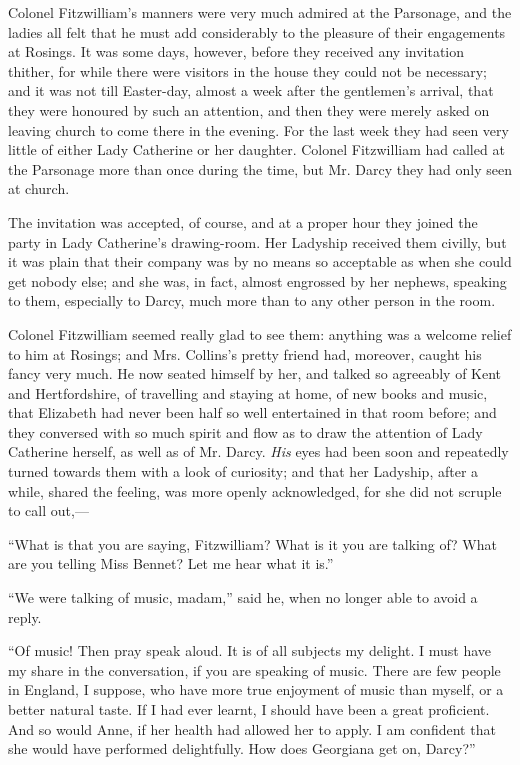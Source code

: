 Colonel Fitzwilliam's manners were very much admired at the Parsonage, and the ladies all felt that he must add considerably to the pleasure of their engagements at Rosings. It was some days, however, before they received any invitation thither, for while there were visitors in the house they could not be necessary; and it was not till Easter-day, almost a week after the gentlemen's arrival, that they were honoured by such an attention, and then they were merely asked on leaving church to come there in the evening. For the last week they had seen very little of either Lady Catherine or her daughter. Colonel Fitzwilliam had called at the Parsonage more than once during the time, but Mr. Darcy they had only seen at church.

The invitation was accepted, of course, and at a proper hour they joined the party in Lady Catherine's drawing-room. Her Ladyship received them civilly, but it was plain that their company was by no means so acceptable as when she could get nobody else; and she was, in fact, almost engrossed by her nephews, speaking to them, especially to Darcy, much more than to any other person in the room.

Colonel Fitzwilliam seemed really glad to see them: anything was a welcome relief to him at Rosings; and Mrs. Collins's pretty friend had, moreover, caught his fancy very much. He now seated himself by her, and talked so agreeably of Kent and Hertfordshire, of travelling and staying at home, of new books and music, that Elizabeth had never been half so well entertained in that room before; and they conversed with so much spirit and flow as to draw the attention of Lady Catherine herself, as well as of Mr. Darcy. \textit{His} eyes had been soon and repeatedly turned towards them with a look of curiosity; and that her Ladyship, after a while, shared the feeling, was more openly acknowledged, for she did not scruple to call out,---

``What is that you are saying, Fitzwilliam? What is it you are talking of? What are you telling Miss Bennet? Let me hear what it is.''

``We were talking of music, madam,'' said he, when no longer able to avoid a reply.

``Of music! Then pray speak aloud. It is of all subjects my delight. I must have my share in the conversation, if you are speaking of music. There are few people in England, I suppose, who have more true enjoyment of music than myself, or a better natural taste. If I had ever learnt, I should have been a great proficient. And so would Anne, if her health had allowed her to apply. I am confident that she would have performed delightfully. How does Georgiana get on, Darcy?''


